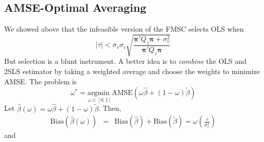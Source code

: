 \documentclass[12pt]{article}
\theoremstyle{definition}
\begin{document}
\subsection{AMSE-Optimal Averaging} %
\label{sub:amse_optimal_averaging}
We showed above that the infeasible version of the FMSC selects OLS when 
  $$|\tau|  < \sigma_v \sigma_\epsilon\sqrt{\frac{\boldsymbol{\pi}'Q_z \boldsymbol{\pi} + \sigma_v^2}{\boldsymbol{\pi}'Q_z \boldsymbol{\pi}}}$$
But selection is a blunt instrument. A better idea is to \emph{combine} the OLS and 2SLS estimator by taking a weighted average and choose the weights to minimize AMSE. The problem is 
  $$\omega^* = \underset{\omega \in [0,1]}{\mbox{argmin }} \mbox{AMSE}\left(\omega \widehat{\beta} + (1-\omega)\widetilde{\beta}\right)  $$
  Let $\widehat{\beta}(\omega) = \omega \widehat{\beta} + (1-\omega) \widetilde{\beta}$. Then,
    \begin{eqnarray*}
      \mbox{Bias}\left(\widehat{\beta}(\omega)\right) &=& \mbox{Bias}(\widehat{\beta}) + \mbox{Bias}(\widetilde{\beta})=\omega\left( \frac{\tau}{\sigma_x^2}\right)
    \end{eqnarray*}
  and
\end{document}
